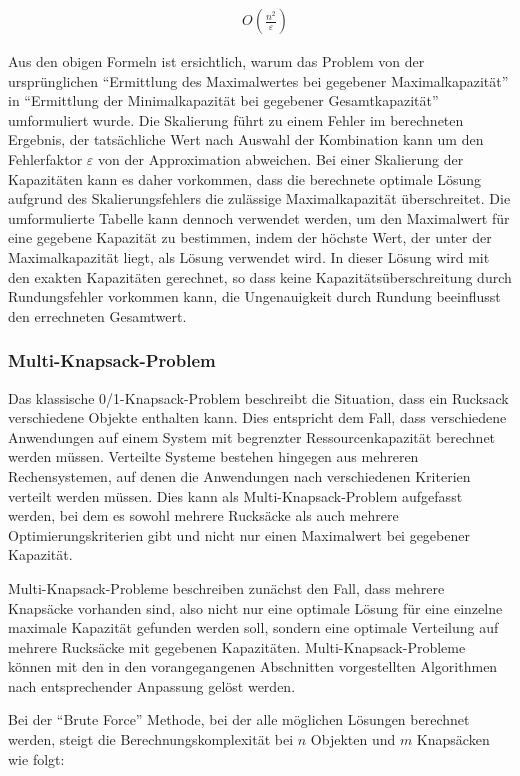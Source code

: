 \begin{align}
    & O(\frac{n^2}{\varepsilon})
\end{align}

Aus den obigen Formeln ist ersichtlich, warum das Problem von der ursprünglichen \enquote{Ermittlung des Maximalwertes bei gegebener Maximalkapazität} in \enquote{Ermittlung der Minimalkapazität bei gegebener Gesamtkapazität} umformuliert wurde. Die Skalierung führt zu einem Fehler im berechneten Ergebnis, der tatsächliche Wert nach Auswahl der Kombination kann um den Fehlerfaktor $ \varepsilon $ von der Approximation abweichen. Bei einer Skalierung der Kapazitäten kann es daher vorkommen, dass die berechnete optimale Lösung aufgrund des Skalierungsfehlers die zulässige Maximalkapazität überschreitet. Die umformulierte Tabelle kann dennoch verwendet werden, um den Maximalwert für eine gegebene Kapazität zu bestimmen, indem der höchste Wert, der unter der Maximalkapazität liegt, als Lösung verwendet wird. In dieser Lösung wird mit den exakten Kapazitäten gerechnet, so dass keine Kapazitätsüberschreitung durch Rundungsfehler vorkommen kann, die Ungenauigkeit durch Rundung beeinflusst den errechneten Gesamtwert.

\subsubsection{Multi-Knapsack-Problem}

Das klassische 0/1-Knapsack-Problem beschreibt die Situation, dass ein Rucksack verschiedene Objekte enthalten kann. Dies entspricht dem Fall, dass verschiedene Anwendungen auf einem System mit begrenzter Ressourcenkapazität berechnet werden müssen. Verteilte Systeme bestehen hingegen aus mehreren Rechensystemen, auf denen die Anwendungen nach verschiedenen Kriterien verteilt werden müssen. Dies kann als Multi-Knapsack-Problem aufgefasst werden, bei dem es sowohl mehrere Rucksäcke als auch mehrere Optimierungskriterien gibt und nicht nur einen Maximalwert bei gegebener Kapazität. 

Multi-Knapsack-Probleme beschreiben zunächst den Fall, dass mehrere Knapsäcke vorhanden sind, also nicht nur eine optimale Lösung für eine einzelne maximale Kapazität gefunden werden soll, sondern eine optimale Verteilung auf mehrere Rucksäcke mit gegebenen Kapazitäten. Multi-Knapsack-Probleme können mit den in den vorangegangenen Abschnitten vorgestellten Algorithmen nach entsprechender Anpassung gelöst werden.

Bei der \enquote{Brute Force} Methode, bei der alle möglichen Lösungen berechnet werden, steigt die Berechnungskomplexität bei $ n $ Objekten und $ m $ Knapsäcken wie folgt:

